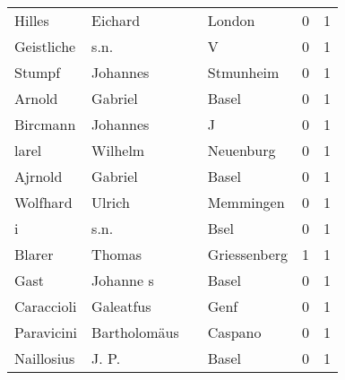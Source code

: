 \begin{tabular}{llllrr}
                   Hilles &                            Eichard &             &                                      London &          0 &         1 \\
               Geistliche &                               s.n. &             &                                           V &          0 &         1 \\
                   Stumpf &                           Johannes &             &                                   Stmunheim &          0 &         1 \\
                   Arnold &                            Gabriel &             &                                       Basel &          0 &         1 \\
                 Bircmann &                           Johannes &             &                                           J &          0 &         1 \\
                    larel &                            Wilhelm &             &                                   Neuenburg &          0 &         1 \\
                  Ajrnold &                            Gabriel &             &                                       Basel &          0 &         1 \\
                 Wolfhard &                             Ulrich &             &                                   Memmingen &          0 &         1 \\
                        i &                               s.n. &             &                                        Bsel &          0 &         1 \\
                   Blarer &                             Thomas &             &                                Griessenberg &          1 &         1 \\
                     Gast &                          Johanne s &             &                                       Basel &          0 &         1 \\
               Caraccioli &                          Galeatfus &             &                                        Genf &          0 &         1 \\
               Paravicini &                       Bartholomäus &             &                                     Caspano &          0 &         1 \\
               Naillosius &                              J. P. &             &                                       Basel &          0 &         1 \\

\end{tabular}
